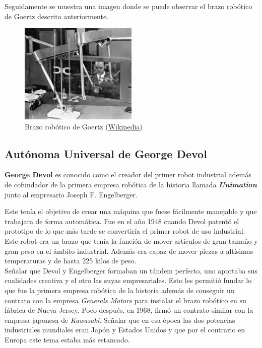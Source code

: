 Seguidamente se muestra una imagen donde se puede observar el brazo robótico de Goertz descrito anteriormente.



\begin{figure}[H]
\begin{center}
  \includegraphics[width=0.5\textwidth]{./EtapaPrimeriza/imagenes/brazo.jpg}
  \caption{Brazo robótico de Goertz (\href{https://en.wikipedia.org/wiki/Raymond\_Goertz\#/media/File:Apf1-06395t.jpg} {Wikipedia})}
  \label{brazo}
\end{center}
\end{figure}


\subsection{Autónoma Universal de George Devol}

\textbf{George Devol} es conocido como el creador del primer robot industrial además de cofundador de la primera empresa robótica de la historia llamada \textit{\textbf{Unimation}} junto al empresario  Joseph F. Engelberger.

Este tenía el objetivo de crear una máquina que fuese fácilmente manejable y que trabajara de forma automática. Fue en el año 1948 cuando Devol patentó el prototipo de lo que más tarde se convertiría el primer robot de uso industrial. Este robot era un brazo que tenía la función de mover artículos de gran tamaño y gran peso en el ámbito industrial. Además era capaz de mover piezas a altísimas temperaturas y de hasta 225 kilos de peso.\\

Señalar que Devol y  Engelberger formaban un tándem perfecto, uno aportaba sus cualidades creativa y el otro las suyas empresariales. Esto les permitió fundar lo que fue la primera empresa robótica de la historia además de conseguir un contrato con la empresa \textit{Generals Motors} para instalar el brazo robótico en su fábrica de Nueva Jersey. Poco después, en 1968, firmó un contrato similar con la empresa japonesa de \textit{Kawasaki}. Señalar que en esa época las dos potencias industriales mundiales eran Japón y Estados Unidos y que por el contrario en Europa este tema estaba más estancado.

